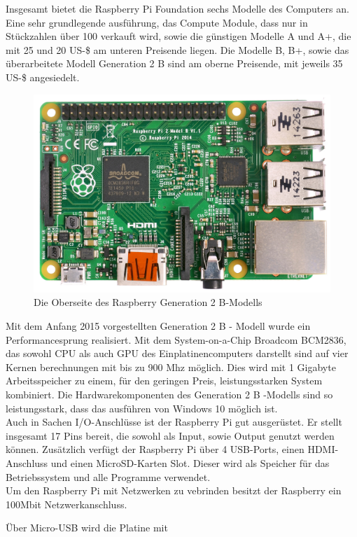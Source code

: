 Insgesamt bietet die Raspberry Pi Foundation sechs Modelle des Computers an. Eine sehr grundlegende ausführung, das Compute Module, dass nur in Stückzahlen über 100 verkauft wird, sowie die günstigen Modelle A und A+, die mit 25 und 20 US-\$ am unteren Preisende liegen. Die Modelle B, B+, sowie das überarbeitete Modell Generation 2 B sind am oberne Preisende, mit jeweils 35 US-\$ angesiedelt. \\

\begin{figure}[H] 
	\centering
	\includegraphics[scale=0.5]{Bilder/raspberry2top}
	\caption{Die Oberseite des Raspberry Generation 2 B-Modells\cite{i:raspberry2top}}
	\label{f:raspberry2top}
\end{figure}

Mit dem Anfang 2015 vorgestellten Generation 2 B - Modell wurde ein Performancesprung realisiert. 
Mit dem System-on-a-Chip Broadcom BCM2836, das sowohl CPU als auch GPU des Einplatinencomputers darstellt sind auf vier Kernen berechnungen mit bis zu 900 \ac{Mhz} möglich. Dies wird mit 1 Gigabyte Arbeitsspeicher zu einem, für den geringen Preis, leistungsstarken System kombiniert.
Die Hardwarekomponenten des Generation 2 B -Modells sind so leistungsstark, dass das ausführen von Windows 10 möglich ist.\\

Auch in Sachen I/O-Anschlüsse ist der Raspberry Pi gut ausgerüstet. Er stellt insgesamt 17 Pins bereit, die sowohl als Input, sowie Output genutzt werden können. Zusätzlich verfügt der Raspberry Pi über 4 \ac{USB}-Ports, einen HDMI-Anschluss und einen MicroSD-Karten Slot. Dieser wird als Speicher für das Betriebssystem und alle Programme verwendet.\\
Um den Raspberry Pi mit Netzwerken zu vebrinden besitzt der Raspberry ein 100Mbit Netzwerkanschluss.

Über Micro-\ac{USB} wird die Platine mit 


